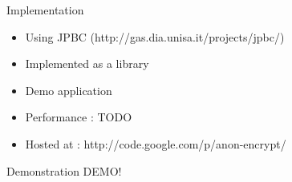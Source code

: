 \documentclass{beamer}
\begin{document}
\begin{frame}{Implementation}
\begin{itemize}
\item Using JPBC (http://gas.dia.unisa.it/projects/jpbc/)
\item Implemented as a library
\item Demo application
\item Performance : TODO
\item Hosted at : http://code.google.com/p/anon-encrypt/
\end{itemize}
\end{frame}

\begin{frame}{Demonstration}
DEMO!
\end{frame}
\end{document}
